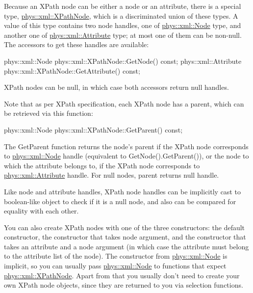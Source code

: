  \par
 Because an XPath node can be either a node or an attribute, there is a special type, \hyperlink{classphys_1_1xml_1_1XPathNode}{phys::xml::XPathNode}, which is a discriminated union of these types. A value of this type contains two node handles, one of \hyperlink{classphys_1_1xml_1_1Node}{phys::xml::Node} type, and another one of \hyperlink{classphys_1_1xml_1_1Attribute}{phys::xml::Attribute} type; at most one of them can be non-\/null. The accessors to get these handles are available: 
\begin{DoxyCode}
 phys::xml::Node phys::xml::XPathNode::GetNode() const;
 phys::xml::Attribute phys::xml::XPathNode::GetAttribute() const;
\end{DoxyCode}
 XPath nodes can be null, in which case both accessors return null handles. \par
 \par
 Note that as per XPath specification, each XPath node has a parent, which can be retrieved via this function: 
\begin{DoxyCode}
 phys::xml::Node phys::xml::XPathNode::GetParent() const;
\end{DoxyCode}
 The GetParent function returns the node's parent if the XPath node corresponds to \hyperlink{classphys_1_1xml_1_1Node}{phys::xml::Node} handle (equivalent to GetNode().GetParent()), or the node to which the attribute belongs to, if the XPath node corresponds to \hyperlink{classphys_1_1xml_1_1Attribute}{phys::xml::Attribute} handle. For null nodes, parent returns null handle. \par
 \par
 Like node and attribute handles, XPath node handles can be implicitly cast to boolean-\/like object to check if it is a null node, and also can be compared for equality with each other. \par
 \par
 You can also create XPath nodes with one of the three constructors: the default constructor, the constructor that takes node argument, and the constructor that takes an attribute and a node argument (in which case the attribute must belong to the attribute list of the node). The constructor from \hyperlink{classphys_1_1xml_1_1Node}{phys::xml::Node} is implicit, so you can usually pass \hyperlink{classphys_1_1xml_1_1Node}{phys::xml::Node} to functions that expect \hyperlink{classphys_1_1xml_1_1XPathNode}{phys::xml::XPathNode}. Apart from that you usually don't need to create your own XPath node objects, since they are returned to you via selection functions. \par
